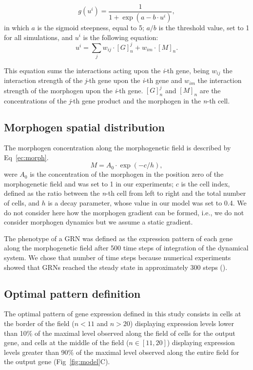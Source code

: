 \documentclass[10pt,letterpaper]{article}
\begin{document}
\begin{equation}
 g(u^i) = \frac{1}{1 + \exp(a - b \cdot u^i)},
 \label{ec:input-func}
\end{equation}
\noindent
in which $a$ is the sigmoid steepness, equal to 5; $a/b$ is the threshold value,
set to 1 for all simulations, and $u^i$ is the following equation:
\begin{equation}
 u^i = \sum_j w_{ij} \cdot [G]^j_n + w_{im} \cdot [M]_n.
 \label{ec:mat-sum}
\end{equation}

This equation sums the interactions acting upon the \emph{i}-th gene, being
$w_{ij}$ the interaction strength of the \emph{j}-th gene upon the \emph{i}-th
gene and $w_{im}$ the interaction strength of the morphogen upon the \emph{i}-th
gene. $[G]^j_n$ and $[M]_n$ are the concentrations of the \emph{j}-th gene
product and the morphogen in the \emph{n}-th cell.

\subsection*{Morphogen spatial distribution}

The morphogen concentration along the morphogenetic field is described by
Eq~\ref{ec:morph}.
\begin{equation}
 M = A_0 \cdot \exp(-c/h),
 \label{ec:morph}
\end{equation}
\noindent
were $A_0$ is the concentration of the morphogen in the position zero of the
morphogenetic field and was set to 1 in our experiments; $c$ is the cell index,
defined as the ratio between the \emph{n}-th cell from left to right and the
total number of cells, and $h$ is a decay parameter, whose value in our model
was set to 0.4. We do not consider here how the morphogen gradient can be
formed, i.e., we do not consider morphogen dynamics but we assume a static
gradient.

The phenotype of a GRN was defined as the expression pattern of each gene along
the morphogenetic field after 500 time steps of integration of the dynamical
system. We chose that number of time steps because numerical experiments showed
that GRNs reached the steady state in approximately 300 steps ().

\subsection*{Optimal pattern definition}

The optimal pattern of gene expression defined in this study consists in cells at
the border of the field ($n<11$ and $n>20$) displaying expression levels lower than
10\% of the maximal level observed along the field of cells for the output gene,
and cells at the middle of the field ($n ∈ [11,20]$) displaying expression
levels greater than 90\% of the maximal level observed along the entire field
for the output gene (Fig~\ref{fig:model}C).
\end{document}
